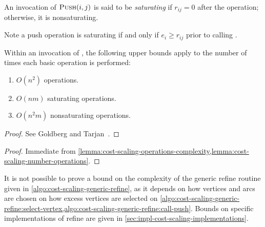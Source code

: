 \begin{defn}
    An invocation of $\textproc{Push}(i,j)$ is said to be \emph{saturating} if $r_{ij} = 0$ after the operation; otherwise, it is nonsaturating.
\end{defn}

\begin{remark}
    Note a push operation is saturating if and only if $e_i \geq r_{ij}$ prior to calling .\\
\end{remark}

\begin{lemma} \label{lemma:cost-scaling-number-operations}
    Within an invocation of , the following upper bounds apply to the number of times each basic operation is performed:
    \begin{enumerate}[label=(\alph*)]
        \item $O(n^2)$  operations.
        \item $O(nm)$ saturating  operations.
        \item $O(n^2m)$ nonsaturating  operations.
    \end{enumerate}
\end{lemma}
\begin{proof}
    See Goldberg and Tarjan~\cite[lemma~6.3, lemma~6.4, lemma~6.7]{Goldberg:1987}.
\end{proof}

\costscalingrefinecomplexity*
\begin{proof}
    Immediate from \cref{lemma:cost-scaling-operations-complexity,lemma:cost-scaling-number-operations}.
\end{proof}

\begin{remark}
    It is not possible to prove a bound on the complexity of the generic refine routine given in \cref{algo:cost-scaling-generic-refine}, as it depends on how vertices and arcs are chosen on how excess vertices are selected on \cref{algo:cost-scaling-generic-refine:select-vertex,algo:cost-scaling-generic-refine:call-push}. Bounds on specific implementations of refine are given in \cref{sec:impl-cost-scaling-implementations}.\\
\end{remark}


